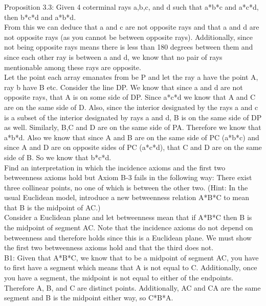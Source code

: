 \documentclass[12pt,letterpaper]{article}
\newcommand{\prob}[1]{\newpage\noindent {\bf #1}}
\begin{document}
Proposition 3.3: Given 4 coterminal rays a,b,c, and d such that a*b*c and a*c*d, then b*c*d and a*b*d.  \\

From this we can deduce that a and c are not opposite rays and that a and d are not opposite rays (as you cannot be between opposite rays).  Additionally, since not being opposite rays means there is less than 180 degrees between them and since each other ray is between a and d, we know that no pair of rays mentionable among these rays are opposite. \\

Let the point each array emanates from be P and let the ray a have the point A, ray b have B etc.  Consider the line DP.  We know that since a and d are not opposite rays, that A is on some side of DP.  Since a*c*d we know that A and C are on the same side of D.  Also, since the interior designated by the rays a and c is a subset of the interior designated by rays a and d, B is on the same side of DP as well.  Similarly, B,C and D are on the same side of PA.  Therefore we know that a*b*d.  Also we know that since A and B are on the same side of PC (a*b*c) and since A and D are on opposite sides of PC (a*c*d), that C and D are on the same side of B. So we know that b*c*d.\\




\prob{15}  Find an interpretation in which the incidence axioms and the first two betweenness axioms hold but Axiom B-3 fails in the following way:  There exist three collinear points, no one of which is between the other two.  (Hint:  In the usual Euclidean model, introduce a new betweenness relation A*B*C to mean that B is the midpoint of AC.)\\

Consider a Euclidean plane and let betweenness mean that if A*B*C then B is the midpoint of segment AC.  Note that the incidence axioms do not depend on betweenness and therefore holds since this is a Euclidean plane.  We must show the first two betweenness axioms hold and that the third does not.\\

B1:  Given that A*B*C, we know that to be a midpoint of segment AC, you have to first have a segment which means that A is not equal to C.  Additionally, once you have a segment, the midpoint is not equal to either of the endpoints.  Therefore A, B, and C are distinct points.  Additionally, AC and CA are the same segment and B is the midpoint either way, so C*B*A.\\
\end{document}
